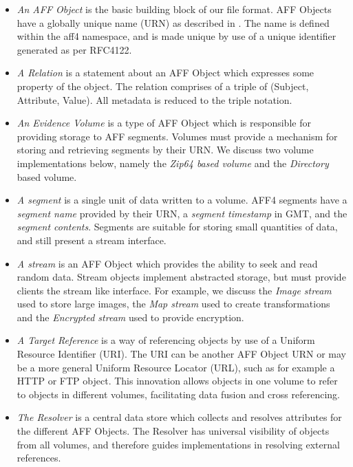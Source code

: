 \documentclass[10pt, conference]{IEEEtran}
\begin{document}
\begin{itemize}
\item \emph{An AFF Object} is the basic building block of our
file format. AFF Objects have a globally unique name (URN) as described in
\cite{RFC1737}. The name is defined within the aff4 namespace, and is
made unique by use of a unique identifier generated as per
RFC4122\cite{RFC4122}.

\item \emph{A Relation} is a statement about an AFF Object which
expresses some property of the object. The relation comprises of a
triple of (Subject, Attribute, Value). All metadata is reduced to the
triple notation.

\item \emph{An Evidence Volume} is a type of AFF Object which is
responsible for providing storage to AFF segments. Volumes must
provide a mechanism for storing and retrieving segments by their
URN. We discuss two volume implementations below, namely the {\em
Zip64 based volume} and the {\em Directory} based volume.

\label{definitions}
\item \emph{A segment} is a single unit of data written to a volume. AFF4
  segments have a \emph{segment name} provided by their URN, a
  \emph{segment timestamp} in GMT, and the \emph{segment
contents}. Segments are suitable for storing small quantities of data,
and still present a stream interface.

\item \emph{A stream} is an AFF Object which provides the ability to
seek and read random data. Stream objects implement abstracted
storage, but must provide clients the stream like interface. For
example, we discuss the {\em Image stream} used to store large images,
the {\em Map stream} used to create transformations and the {\em
Encrypted stream} used to provide encryption.

\item \emph{A Target Reference} is a way of referencing objects by use
of a Uniform Resource Identifier (URI). The URI can be another AFF
Object URN or may be a more general Uniform Resource Locator (URL),
such as for example a HTTP or FTP object. This innovation allows
objects in one volume to refer to objects in different volumes,
facilitating data fusion and cross referencing.

\item \emph{The Resolver} is a central data store which collects and resolves
attributes for the different AFF Objects. The Resolver has universal
visibility of objects from all volumes, and therefore guides
implementations in resolving external references. 
\end{itemize}
\end{document}
